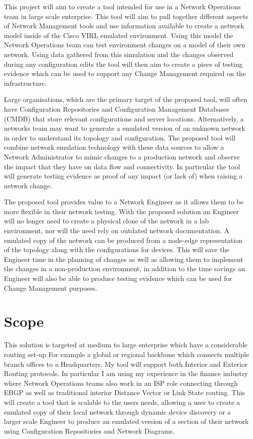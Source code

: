 \documentclass[11pt]{report}
\begin{document}
This project will aim to create a tool intended for use in a Network Operations team in large scale enterprise. This tool will aim to pull together different aspects of Network Management tools and use information available to create a network model inside of the Cisco VIRL emulated environment. Using this model the Network Operations team can test environment changes on a model of their own network. Using data gathered from this simulation and the changes observed during any configuration edits the tool will then aim to create a piece of testing evidence which can be used to support any Change Management required on the infrastructure.

Large organisations, which are the primary target of the proposed tool, will often have Configuration Repositories and Configuration Management Databases (CMDB) that store relevant configurations and server locations. Alternatively, a networks team may want to generate a emulated version of an unknown network in order to understand its topology and configuration. The proposed tool will combine network emulation technology with these data sources to allow a Network Administrator to mimic changes to a production network and observe the impact that they have on data flow and connectivity. In particular the tool will generate testing evidence as proof of any impact (or lack of) when raising a network change.

The proposed tool provides value to a Network Engineer as it allows them to be more flexible in their network testing. With the proposed solution an Engineer will no longer need to create a physical clone of the network in a lab environment, nor will the need rely on outdated network documentation. A emulated copy of the network can be produced from a node-edge representation of the topology along with the configurations for devices. This will save the Engineer time in the planning of changes as well as allowing them to implement the changes in a non-production environment, in addition to the time savings an Engineer will also be able to produce testing evidence which can be used for Change Management purposes.

\section{Scope}

This solution is targeted at medium to large enterprise which have a considerable routing set-up For example a global or regional backbone which connects multiple branch offices to a Headquarters. My tool will support both Interior and Exterior Routing protocols. In particular I am using my experience in the finance industry where Network Operations teams also work in an ISP role connecting through EBGP as well as traditional interior Distance Vector or Link State routing. This will create a tool that is scalable to the users needs, allowing a user to create a emulated copy of their local network through dynamic device discovery or a larger scale Engineer to produce an emulated version of a section of their network using Configuration Repositories and Network Diagrams.
\end{document}
